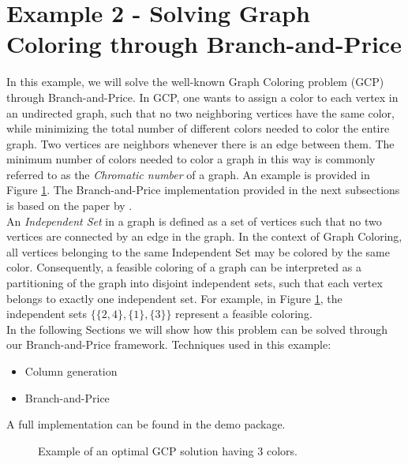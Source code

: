 \documentclass[a4paper]{article}
\begin{document}
\section{Example 2 - Solving Graph Coloring through Branch-and-Price}\label{sec:gcp}
In this example, we will solve the well-known Graph Coloring problem (GCP) through Branch-and-Price. In GCP, one wants to assign a color to each vertex in an undirected graph, such that no two neighboring vertices have the same color, while minimizing the total number of different colors needed to color the entire graph. Two vertices are neighbors whenever there is an edge between them. The minimum number of colors needed to color a graph in this way is commonly referred to as the \emph{Chromatic number} of a graph. An example is provided in Figure \ref{fig:gcp_example}. The Branch-and-Price implementation provided in the next subsections is based on the paper by \citet{METR95}.\\
An \emph{Independent Set} in a graph is defined as a set of vertices such that no two vertices are connected by an edge in the graph. In the context of Graph Coloring, all vertices belonging to the same Independent Set may be colored by the same color. Consequently, a feasible coloring of a graph can be interpreted as a partitioning of the graph into disjoint independent sets, such that each vertex belongs to exactly one independent set. For example, in Figure \ref{fig:gcp_example}, the independent sets $\{\{2,4\}, \{1\}, \{3\}\}$ represent a feasible coloring.\\
In the following Sections we will show how this problem can be solved through our Branch-and-Price framework. Techniques used in this example:
\begin{itemize}
 \item Column generation
 \item Branch-and-Price
\end{itemize}
A full implementation can be found in the demo package.

\begin{figure}
\centering
{}
\caption[Example of a GCP solution.]{Example of an optimal GCP solution having 3 colors.}
\label{fig:gcp_example}
\end{figure}
\end{document}
